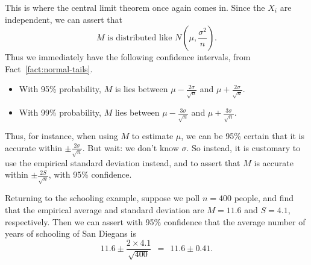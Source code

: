 This is where the central limit theorem once again comes in. Since the $X_i$ are
independent, we can assert that
$$ M \mbox{\ is distributed like\ } N\left(\mu, \frac{\sigma^2}{n} \right) .$$
Thus we immediately have the following confidence intervals, from 
Fact~\ref{fact:normal-tails}.
\begin{itemize}
\item With 95\% probability, $M$ is lies between $\mu-\frac{2\sigma}{\sqrt{n}}$ and 
$\mu+\frac{2\sigma}{\sqrt{n}}$.
\item With 99\% probability, $M$ lies between $\mu-\frac{3\sigma}{\sqrt{n}}$ and 
$\mu+\frac{3\sigma}{\sqrt{n}}$.
\end{itemize}
Thus, for instance, when using $M$ to estimate $\mu$, we can be 95\% certain that 
it is accurate within $\pm \frac{2\sigma}{\sqrt{n}}$. But wait: we don't know
$\sigma$. So instead, it is customary to use the empirical standard deviation
instead, and to assert that $M$ is accurate within  $\pm \frac{2 S}{\sqrt{n}}$,
with 95\% confidence.

Returning to the schooling example, suppose we poll $n = 400$ people, and find 
that the empirical average and standard deviation are $M = 11.6$ and $S = 4.1$,
respectively. Then we can assert with 95\% confidence that the average number
of years of schooling of San Diegans is
$$ 11.6 \pm \frac{2 \times 4.1}{\sqrt{400}} \ \ = \ \ 11.6 \pm 0.41 .$$

 
